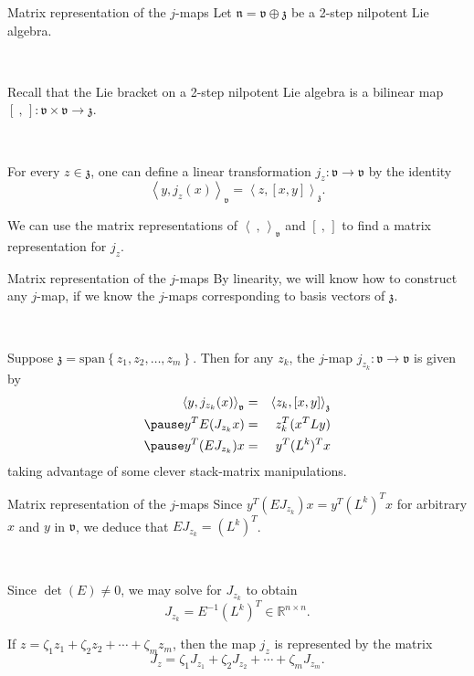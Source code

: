 \documentclass{beamer}
\newcommand{\br}[2]{\left[#1,#2\right]}
\newcommand{\bre}{\br{\ }{\,}}
\newcommand{\ds}{\oplus}
\newcommand{\inp}[2]{\left\langle #1,#2\right\rangle}
\newcommand{\inpe}{\inp{\ }{\,}}
\newcommand{\lal}[1]{\mathfrak{#1}}
\newcommand{\lan}{\lal{n}}
\newcommand{\lav}{\lal{v}}
\newcommand{\laz}{\lal{z}}
\newcommand{\R}{\mathbb{R}}
\renewcommand{\span}[1]{\text{span}\left\{#1\right\}}
\begin{document}
\begin{frame}{Matrix representation of the $j$-maps}
Let $\lan = \lav \ds \laz$ be a 2-step nilpotent Lie algebra.
\pause

\

Recall that the Lie bracket on a 2-step nilpotent Lie algebra is a bilinear
map $\bre :\lav \times \lav \to \laz$.
\pause

\


For every $z \in \laz$, one can define a linear transformation 
$j_z :\lav \to \lav$ by the identity
$$
\inp{y}{j_z(x)}_\lav = \inp{z}{\br{x}{y}}_\laz.
$$
\pause

We can use the matrix representations of $\inpe_\lav$ and $\bre$ to find a
matrix representation for $j_z$.
\end{frame}

\begin{frame}{Matrix representation of the $j$-maps}
By linearity, we will know how to construct any $j$-map, if we know the
$j$-maps corresponding to basis vectors of $\laz$. 
\pause

\

Suppose $\laz = \span{z_1,z_2,\hdots,z_m}$.
\pause
Then for any $z_k$, the $j$-map $j_{z_k} :\lav \to \lav$ is given by
\begin{eqnarray*}
\inp{y}{j_{z_k}(x)}_\lav	& = & \inp{z_k}{\br{x}{y}}_\laz \\ \pause
y^T E (J_{z_k}x)		& = & z_k^T (x^TLy) \\ \pause
y^T (E J_{z_k}) x		& = & y^T(L^k)^T x
\end{eqnarray*}
taking advantage of some clever stack-matrix manipulations.
\end{frame}

\begin{frame}{Matrix representation of the $j$-maps}
Since $y^T(EJ_{z_k})x = y^T(L^k)^Tx$ for arbitrary $x$ and $y$ in $\lav$, we
deduce that $EJ_{z_k} = (L^k)^T$.
\pause

\

Since $\det(E) \neq 0$, we may solve for $J_{z_k}$ to obtain
\pause
$$
J_{z_k} = E^{-1}(L^k)^T \in \R^{n \times n}.
$$
\pause

If $z = \zeta_1z_1 + \zeta_2z_2 + \cdots + \zeta_mz_m$, then the map
$j_z$ is represented by the matrix
\pause
$$
J_z = \zeta_1J_{z_1} + \zeta_2J_{z_2} + \cdots + \zeta_mJ_{z_m}.
$$
\end{frame}
\end{document}
